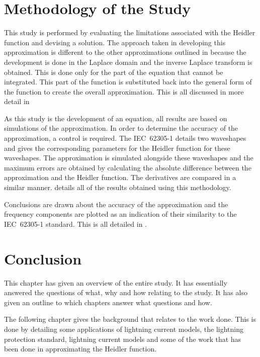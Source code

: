 
\section{Methodology of the Study}
\label{sec:approach_study_methodology}
This study is performed by evaluating the limitations associated with the Heidler function and devising a solution. The approach taken in developing this approximation is different to the other approximations outlined in  because the development is done in the Laplace domain and the inverse Laplace transform is obtained. This is done only for the part of the equation that cannot be integrated. This part of the function is substituted back into the general form of the function to create the overall approximation. This is all discussed in more detail in 

As this study is the development of an equation, all results are based on simulations of the approximation. In order to determine the accuracy of the approximation, a control is required. The IEC~62305-1 details two waveshapes and gives the corresponding parameters for the Heidler function for these waveshapes. The approximation is simulated alongside these waveshapes and the maximum errors are obtained by calculating the absolute difference between the approximation and the Heidler function. The derivatives are compared in a similar manner.  details all of the results obtained using this methodology.

Conclusions are drawn about the accuracy of the approximation and the frequency components are plotted as an indication of their similarity to the IEC~62305-1 standard. This is all detailed in .


\section{Conclusion}
\label{sec:approach_conclusion}
This chapter has given an overview of the entire study. It has essentially answered the questions of what, why and how relating to the study. It has also given an outline to which chapters answer what questions and how.

The following chapter gives the background that relates to the work done. This is done by detailing some applications of lightning current models, the lightning protection standard, lightning current models and some of the work that has been done in approximating the Heidler function.
